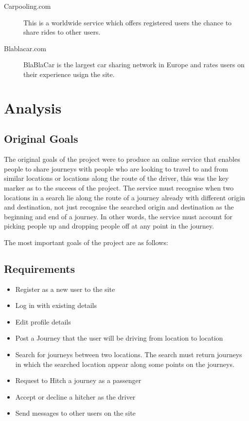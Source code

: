 	\begin{description}
	\item[Carpooling.com] This is a worldwide service which offers registered users the chance to share rides to other users.
	\item[Blablacar.com] BlaBlaCar is the largest car sharing network in Europe and rates users on their experience usign the site.
	\end{description}
	

\section{Analysis}

\subsection{Original Goals}
	The original goals of the project were to produce an online service that enables people to share journeys with people who are looking to travel to and from similar locations or locations along the route of the driver, this was the key marker as to the success of the project. The service must recognise when two locations in a search lie along the route of a journey already with different origin and destination, not just recognise the searched origin and destination as the beginning and end of a journey. In other words, the service must account for picking people up and dropping people off at any point in the journey.

The most important goals of the project are as follows:
	
\subsection{Requirements}
\begin{itemize}
\item Register as a new user to the site
\item Log in with existing details
\item Edit profile details
\item Post a Journey that the user will be driving from location to location
\item Search for journeys between two locations. The search must return journeys in which the searched location appear along some points on the journeys.
\item Request to Hitch a journey as a passenger
\item Accept or decline a hitcher as the driver
\item Send messages to other users on the site
\end{itemize}

